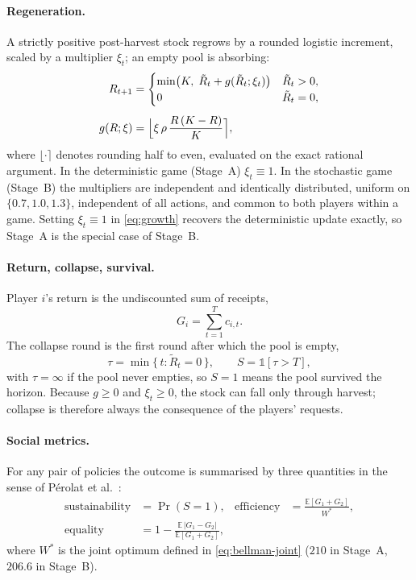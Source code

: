 \paragraph{Regeneration.}
A strictly positive post-harvest stock regrows by a rounded logistic
increment, scaled by a multiplier \(\xi_t\); an empty pool is absorbing:
\begin{align}
  R_{t+1} &=
  \begin{cases}
    \min\bigl(K,\; \tilde{R}_t + g(\tilde{R}_t; \xi_t)\bigr) & \tilde{R}_t > 0, \\
    0 & \tilde{R}_t = 0,
  \end{cases}
  \label{eq:regen} \\[4pt]
  g(R; \xi) &= \Bigl\lfloor \xi\, \rho\, \frac{R\,(K - R)}{K} \Bigr\rceil ,
  \label{eq:growth}
\end{align}
where \(\lfloor \cdot \rceil\) denotes rounding half to even, evaluated on
the exact rational argument.
In the deterministic game (Stage~A) \(\xi_t \equiv 1\).
In the stochastic game (Stage~B) the multipliers are independent and
identically distributed, uniform on \(\{0.7, 1.0, 1.3\}\), independent of
all actions, and common to both players within a game.
Setting \(\xi_t \equiv 1\) in \eqref{eq:growth} recovers the deterministic
update exactly, so Stage~A is the special case of Stage~B.

\paragraph{Return, collapse, survival.}
Player \(i\)'s return is the undiscounted sum of receipts,
\begin{equation}
  G_i = \sum_{t=1}^{T} c_{i,t} .
  \label{eq:return}
\end{equation}
The collapse round is the first round after which the pool is empty,
\begin{equation}
  \tau = \min\{\, t : \tilde{R}_t = 0 \,\},
  \qquad
  S = \mathbb{1}[\tau > T],
  \label{eq:collapse}
\end{equation}
with \(\tau = \infty\) if the pool never empties, so \(S = 1\) means the
pool survived the horizon.
Because \(g \ge 0\) and \(\xi_t \ge 0\), the stock can fall only through
harvest; collapse is therefore always the consequence of the players'
requests.

\paragraph{Social metrics.}
For any pair of policies the outcome is summarised by three quantities
in the sense of P\'erolat et al.\ \cite{perolat2017}:
\begin{equation}
  \begin{aligned}
  \text{sustainability} &= \Pr(S = 1), &
  \text{efficiency} &= \frac{\mathbb{E}[G_1 + G_2]}{W^{*}}, \\[2pt]
  \text{equality} &= 1 - \frac{\mathbb{E}\,|G_1 - G_2|}{\mathbb{E}[G_1 + G_2]},
  \end{aligned}
  \label{eq:metrics}
\end{equation}
where \(W^{*}\) is the joint optimum defined in \eqref{eq:bellman-joint}
(\(210\) in Stage~A, \(206.6\) in Stage~B).

